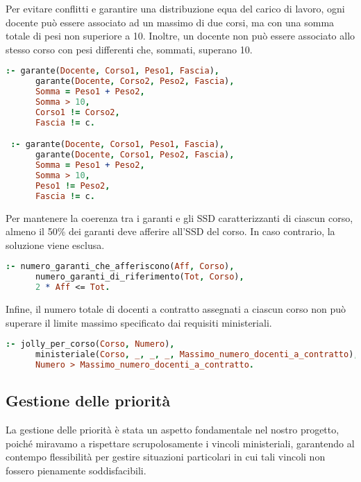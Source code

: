 Per evitare conflitti e garantire una distribuzione equa del carico di lavoro, ogni docente 
può essere associato ad un massimo di due corsi, ma con una somma totale di pesi non superiore 
a 10. Inoltre, un docente non può essere associato allo stesso corso con pesi differenti che, 
sommati, superano 10.

\begin{lstlisting}[language=prolog, caption={Vincoli sulla distribuzione dei pesi per docente.}]
 :- garante(Docente, Corso1, Peso1, Fascia),
      garante(Docente, Corso2, Peso2, Fascia),
      Somma = Peso1 + Peso2,
      Somma > 10,
      Corso1 != Corso2,
      Fascia != c.

 :- garante(Docente, Corso1, Peso1, Fascia),
      garante(Docente, Corso1, Peso2, Fascia),
      Somma = Peso1 + Peso2,
      Somma > 10,
      Peso1 != Peso2,
      Fascia != c.
\end{lstlisting}

Per mantenere la coerenza tra i garanti e gli SSD caratterizzanti di ciascun corso, almeno 
il 50\% dei garanti deve afferire all'SSD del corso. In caso contrario, la soluzione viene esclusa.

\begin{lstlisting}[language=prolog, caption={Vincolo sui garanti afferenti al SSD caratterizzante.}]
 :- numero_garanti_che_afferiscono(Aff, Corso),
      numero_garanti_di_riferimento(Tot, Corso),
      2 * Aff <= Tot.
\end{lstlisting}

Infine, il numero totale di docenti a contratto assegnati a ciascun corso non può superare il 
limite massimo specificato dai requisiti ministeriali.

\begin{lstlisting}[language=prolog, caption={Vincolo sul numero massimo di docenti a contratto.}]
 :- jolly_per_corso(Corso, Numero),
      ministeriale(Corso, _, _, _, Massimo_numero_docenti_a_contratto),
      Numero > Massimo_numero_docenti_a_contratto.
\end{lstlisting}






\subsection{Gestione delle priorità}\label{sec:priorita}
La gestione delle priorità è stata un aspetto fondamentale nel nostro progetto, poiché 
miravamo a rispettare scrupolosamente i vincoli ministeriali, garantendo al contempo 
flessibilità per gestire situazioni particolari in cui tali vincoli non fossero 
pienamente soddisfacibili.

